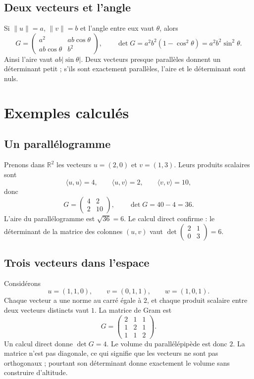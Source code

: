 \subsection{Deux vecteurs et l'angle}
Si $\|u\|=a$, $\|v\|=b$ et l'angle entre eux vaut $\theta$, alors
\[
 G=\begin{pmatrix}a^2&ab\cos\theta\\ab\cos\theta&b^2\end{pmatrix},\qquad
 \det G=a^2b^2(1-\cos^2\theta)=a^2b^2\sin^2\theta.
\]
Ainsi l'aire vaut $ab|\sin\theta|$. Deux vecteurs presque parallèles donnent un déterminant petit ; s'ils sont exactement parallèles, l'aire et le déterminant sont nuls.

\section{Exemples calculés}
\subsection{Un parallélogramme}
Prenons dans $\mathbb R^2$ les vecteurs $u=(2,0)$ et $v=(1,3)$. Leurs produits scalaires sont
\[
 \langle u,u\rangle=4,\qquad \langle u,v\rangle=2,\qquad \langle v,v\rangle=10,
\]
donc
\[
 G=\begin{pmatrix}4&2\\2&10\end{pmatrix},\qquad \det G=40-4=36.
\]
L'aire du parallélogramme est $\sqrt{36}=6$. Le calcul direct confirme : le déterminant de la matrice des colonnes $(u,v)$ vaut $\det\begin{pmatrix}2&1\\0&3\end{pmatrix}=6$.

\subsection{Trois vecteurs dans l'espace}
Considérons
\[
 u=(1,1,0),\qquad v=(0,1,1),\qquad w=(1,0,1).
\]
Chaque vecteur a une norme au carré égale à $2$, et chaque produit scalaire entre deux vecteurs distincts vaut $1$. La matrice de Gram est
\[
 G=\begin{pmatrix}2&1&1\\1&2&1\\1&1&2\end{pmatrix}.
\]
Un calcul direct donne $\det G=4$. Le volume du parallélépipède est donc $2$. La matrice n'est pas diagonale, ce qui signifie que les vecteurs ne sont pas orthogonaux ; pourtant son déterminant donne exactement le volume sans construire d'altitude.

